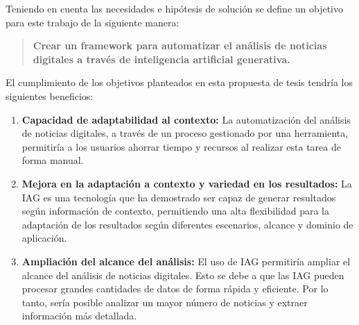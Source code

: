 \documentclass[12pt]{article}
\begin{document}


Teniendo en cuenta las necesidades e hipótesis de solución se define un objetivo para este trabajo de la siguiente manera: 

\begin{quote}
        \textbf{Crear un framework para automatizar el análisis de noticias digitales a través de inteligencia artificial generativa.
        }
\end{quote}

El cumplimiento de los objetivos planteados en esta propuesta de tesis tendría los siguientes beneficios:


\begin{enumerate}
    \item \textbf{Capacidad de adaptabilidad al contexto:} La automatización del análisis de noticias digitales, a través de un proceso gestionado por una herramienta,  permitiría a los usuarios ahorrar tiempo y recursos al realizar esta tarea de forma manual. 

    \item \textbf{Mejora en la adaptación a contexto y variedad en los resultados:} La IAG es una tecnología que ha demostrado ser capaz de generar resultados según información de contexto, permitiendo una alta flexibilidad para la adaptación de los resultados según diferentes escenarios, alcance y dominio de aplicación. 

    \item \textbf{Ampliación del alcance del análisis:} El uso de IAG permitiría ampliar el alcance del análisis de noticias digitales. Esto se debe a que las IAG pueden procesar grandes cantidades de datos de forma rápida y eficiente. Por lo tanto, sería posible analizar un mayor número de noticias y extraer información más detallada.

\end{enumerate}
\end{document}
